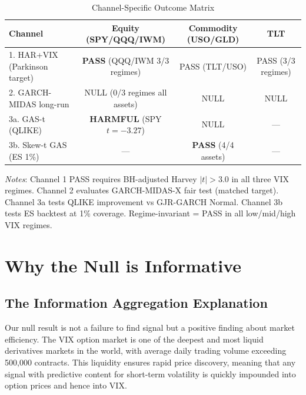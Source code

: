 \documentclass[12pt,a4paper]{article}
\begin{document}
\begin{table}[H]
\centering
\small
\begin{threeparttable}
\caption{Channel-Specific Outcome Matrix}
\label{tab:channel_outcomes}
\begin{tabular}{@{}lccc@{}}
\toprule
Channel & Equity (SPY/QQQ/IWM) & Commodity (USO/GLD) & TLT \\
\midrule
1. HAR+VIX (Parkinson target) & \textbf{PASS} (QQQ/IWM 3/3 regimes) & PASS (TLT/USO) & PASS (3/3 regimes) \\
2. GARCH-MIDAS long-run & NULL (0/3 regimes all assets) & NULL & NULL \\
3a. GAS-t (QLIKE) & \textbf{HARMFUL} (SPY $t=-3.27$) & NULL & --- \\
3b. Skew-t GAS (ES 1\%) & --- & \textbf{PASS} (4/4 assets) & --- \\
\bottomrule
\end{tabular}
\begin{tablenotes}
\small
\item \textit{Notes}: Channel 1 PASS requires BH-adjusted Harvey $|t|>3.0$ in all three VIX regimes. Channel 2 evaluates GARCH-MIDAS-X fair test (matched target). Channel 3a tests QLIKE improvement vs GJR-GARCH Normal. Channel 3b tests ES backtest at 1\% coverage. Regime-invariant = PASS in all low/mid/high VIX regimes.
\end{tablenotes}
\end{threeparttable}
\end{table}

\section{Why the Null is Informative}
\label{sec:null}

\subsection{The Information Aggregation Explanation}

Our null result is not a failure to find signal but a positive finding about market efficiency. The VIX option market is one of the deepest and most liquid derivatives markets in the world, with average daily trading volume exceeding 500,000 contracts. This liquidity ensures rapid price discovery, meaning that any signal with predictive content for short-term volatility is quickly impounded into option prices and hence into VIX.
\end{document}
